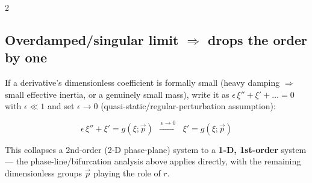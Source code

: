 \documentclass[10pt]{article}
\begin{document}
\begin{multicols}{2}
\subsection*{Overdamped/singular limit $\Rightarrow$ drops the order by one}
If a derivative's dimensionless coefficient is formally small (heavy damping $\Rightarrow$ small effective inertia, or a genuinely small mass), write it as $\epsilon\,\xi''+\xi'+\dots=0$ with $\epsilon\ll1$ and set $\epsilon\to0$ (quasi-static/regular-perturbation assumption):
\begin{keybox}
\[
    \epsilon\,\xi''+\xi' = g(\xi;\vec p) \ \ \xrightarrow{\ \epsilon\to0\ }\ \ \xi' = g(\xi;\vec p)
\]
\end{keybox}
This collapses a 2nd-order (2-D phase-plane) system to a \textbf{1-D, 1st-order} system --- the phase-line/bifurcation analysis above applies directly, with the remaining dimensionless groups $\vec p$ playing the role of $r$.

\end{multicols}
\end{document}
